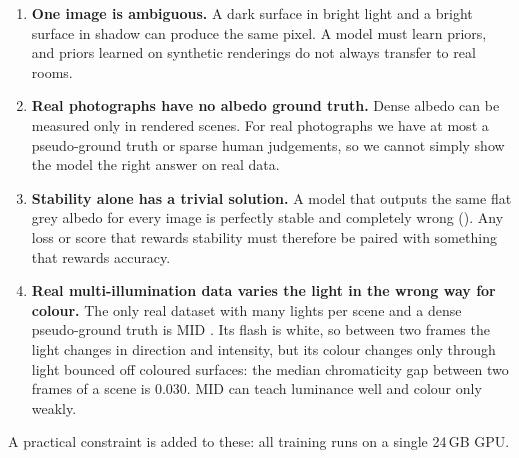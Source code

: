 \begin{enumerate}
  \item \textbf{One image is ambiguous.} A dark surface in bright light and a bright surface
  in shadow can produce the same pixel. A model must learn priors, and priors learned on
  synthetic renderings do not always transfer to real rooms.

  \item \textbf{Real photographs have no albedo ground truth.} Dense albedo can be measured
  only in rendered scenes. For real photographs we have at most a pseudo-ground truth or
  sparse human judgements, so we cannot simply show the model the right answer on real data.

  \item \textbf{Stability alone has a trivial solution.} A model that outputs the same flat
  grey albedo for every image is perfectly stable and completely wrong
  (). Any loss or score that rewards stability must therefore be
  paired with something that rewards accuracy.

  \item \textbf{Real multi-illumination data varies the light in the wrong way for colour.}
  The only real dataset with many lights per scene and a dense pseudo-ground truth is MID
  . Its flash is white, so between two frames the light changes in
  direction and intensity, but its colour changes only through light bounced off coloured
  surfaces: the median chromaticity gap between two frames of a scene is $0.030$. MID can
  teach luminance well and colour only weakly.
\end{enumerate}

A practical constraint is added to these: all training runs on a single 24\,GB GPU.

